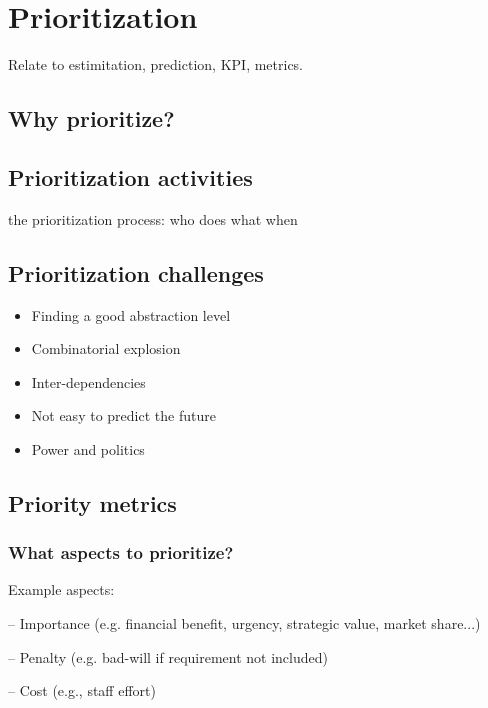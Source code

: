 
\chapter{Prioritization}%
Relate to estimitation, prediction, KPI, metrics.


\section{Why prioritize?}%

\section{Prioritization activities}
the prioritization process: who does what when 

\section{Prioritization challenges}
\begin{itemize}
  \item Finding a good abstraction level
  \item  Combinatorial explosion
  \item  Inter-dependencies
  \item   Not easy to predict the future
  \item  Power and politics
\end{itemize}


\section{Priority metrics}
\subsection{What aspects to prioritize?}


Example aspects:

-- Importance (e.g. financial benefit, urgency, strategic value, market share...)

--  Penalty (e.g. bad-will if requirement not included)

--  Cost (e.g., staff effort)

